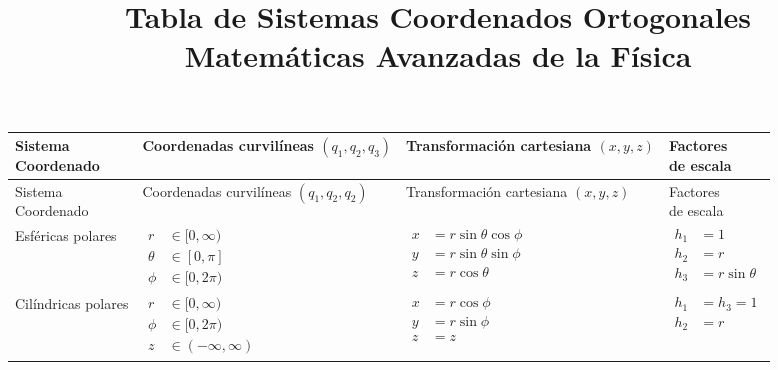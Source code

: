 \documentclass[12pt,landscape]{article}
\title{Tabla de Sistemas Coordenados Ortogonales \\ {\large Matemáticas Avanzadas de la Física}}
\date{ }
\author{}
\numberwithin{equation}{section}
\begin{document}
\maketitle
\fontsize{14}{14}\selectfont
\vspace{-2cm}

{\renewcommand{\arraystretch}{4}%
\begin{longtable}{| l | p{5cm} | l | p{7.3cm} |}
\hline

\makecell{Sistema \\ Coordenado} & \makecell{Coordenadas \\ curvilíneas \\ $(q_{1}, q_{2}, q_{3})$} & \makecell{Transformación cartesiana \\ $(x, y,z)$} & \makecell{Factores \\ de escala} \\ \hline
\endfirsthead

\hline
\makecell{Sistema \\ Coordenado} & \makecell{Coordenadas \\ curvilíneas \\ $(q_{1}, q_{2}, q_{2})$} & \makecell{Transformación cartesiana \\ $(x, y,z)$} & \makecell{Factores \\ de escala} \\ \hline
\endhead

Esféricas polares & 
$\!\begin{aligned}
r &\in [0, \infty) \\
\theta &\in [0, \pi] \\
\phi &\in [0, 2\pi)
\end{aligned}$ & $\!\begin{aligned} 
x &= r \sin \theta \cos \phi \\ 
y &= r \sin \theta \sin \phi \\
z &= r \cos \theta
\end{aligned}$ & 
$\!\begin{aligned} %
h_{1} &= 1 \\
h_{2} &= r \\
h_{3} &= r \sin \theta
\end{aligned}$ \\ \hline

Cilíndricas polares & $\!\begin{aligned}
r &\in[0,\infty) \\
\phi &\in [0,2\pi) \\
z &\in (-\infty,\infty) 
\end{aligned}$ &
$\!\begin{aligned}
x &= r \cos \phi \\
y &= r \sin \phi \\
z &= z
\end{aligned}$ &
$\!\begin{aligned}
h_{1 }&= h_{3} = 1 \\
h_{2} &= r
\end{aligned}$ \\ \hline


\end{longtable}}
\end{document}
